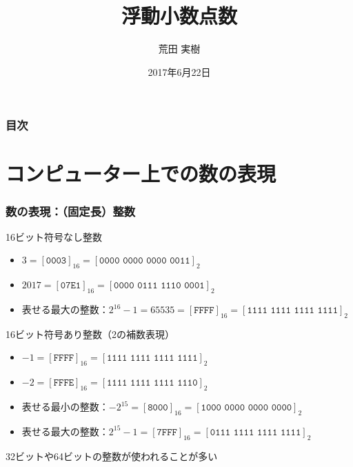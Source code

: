 \documentclass[aspectratio=169]{beamer}
\title{浮動小数点数}
\author{荒田 実樹}
\date{2017年6月22日}
\newcommand{\hexa}[1]{[\texttt{#1}]_{16}}
\newcommand{\binary}[1]{[\texttt{#1}]_{2}}
\begin{document}
\begin{frame}\frametitle{}
  \titlepage
\end{frame}
\begin{frame}\frametitle{目次}
  \tableofcontents
\end{frame}
\section{コンピューター上での数の表現}
\begin{frame}\frametitle{数の表現：（固定長）整数}
  \begin{block}{16ビット符号なし整数}
    \begin{itemize}
    \item $3=\hexa{0003}=\binary{0000 0000 0000 0011}$
    \item $2017=\hexa{07E1}=\binary{0000 0111 1110 0001}$
    \item 表せる最大の整数：$2^{16}-1=65535=\hexa{FFFF}=\binary{1111 1111 1111 1111}$
    \end{itemize}
  \end{block}

  \begin{block}{16ビット符号あり整数（2の補数表現）}
    \begin{itemize}
    \item $-1=\hexa{FFFF}=\binary{1111 1111 1111 1111}$
    \item $-2=\hexa{FFFE}=\binary{1111 1111 1111 1110}$
    \item 表せる最小の整数：$-2^{15}=\hexa{8000}=\binary{1000 0000 0000 0000}$
    \item 表せる最大の整数：$2^{15}-1=\hexa{7FFF}=\binary{0111 1111 1111 1111}$
    \end{itemize}
  \end{block}

  32ビットや64ビットの整数が使われることが多い
\end{frame}
\end{document}
